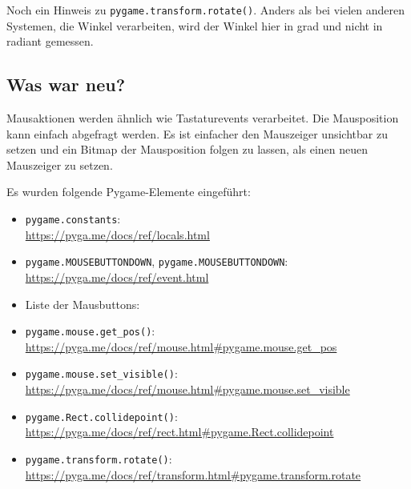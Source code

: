 
Noch ein Hinweis zu \texttt{pygame.transform.rotate()}. Anders als bei vielen anderen Systemen, die Winkel verarbeiten, wird der Winkel hier in \gls{grad} und nicht in \gls{radiant} gemessen.


\subsection*{Was war neu?}

Mausaktionen werden ähnlich wie Tastaturevents verarbeitet. Die Mausposition kann einfach abgefragt werden. Es ist einfacher den Mauszeiger unsichtbar zu setzen und ein Bitmap der Mausposition folgen zu lassen, als einen neuen Mauszeiger zu setzen.

Es wurden folgende Pygame-Elemente eingeführt:
\begin{itemize}
	\item \texttt{pygame.constants}:
	\\ 
	\url{https://pyga.me/docs/ref/locals.html}

	\item \texttt{pygame.MOUSEBUTTONDOWN}, \texttt{pygame.MOUSEBUTTONDOWN}:
	\\ \url{https://pyga.me/docs/ref/event.html}

	\item Liste der Mausbuttons: 
	\item \texttt{pygame.mouse.get\_pos()}:
    \\ \url{https://pyga.me/docs/ref/mouse.html#pygame.mouse.get_pos}

	\item \texttt{pygame.mouse.set\_visible()}:
    \\ \url{https://pyga.me/docs/ref/mouse.html#pygame.mouse.set_visible}

	\item \texttt{pygame.Rect.collidepoint()}:
    \\ \url{https://pyga.me/docs/ref/rect.html#pygame.Rect.collidepoint}

	\item \texttt{pygame.transform.rotate()}:
    \\ \url{https://pyga.me/docs/ref/transform.html#pygame.transform.rotate}

\end{itemize}


